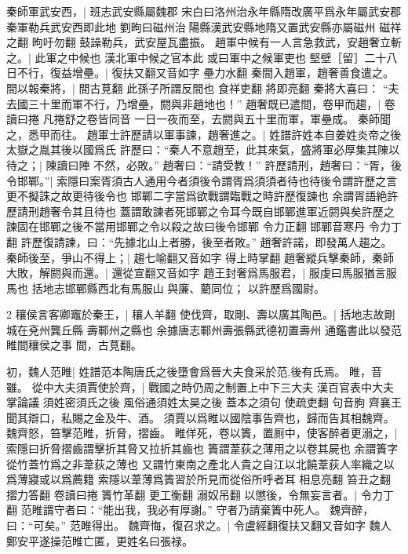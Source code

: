 秦師軍武安{\kern 2pt}西，|{
	班志武安縣屬魏郡
	宋白曰洛州治永年縣隋改廣平爲永年屬武安郡
	秦軍勒兵武安西即此地
	劉昫曰磁州治陽縣漢武安縣地隋又置武安縣亦屬磁州
	磁祥之翻
	昫吁勿翻
	}
鼓譟勒兵，武安屋瓦盡振。
趙軍中候有一人言急救武，安趙奢立斬之。|{
	此軍之中候也
	漢北軍中候之官本此
	或曰軍中之候軍吏也
	}
堅壁［留］二十八日不行，復益增壘。|{
	復扶又翻又音如字
	壘力水翻}
秦間入趙軍，趙奢善食遣之。
間以報秦將，|{
	間古莧翻
	此孫子所謂反間也
	食祥吏翻
	將即亮翻
	}
秦將大喜曰：
“夫去國三十里而軍不行，乃增壘，閼與非趙地也！”
趙奢既已遣間，卷甲而趨，|{
	卷讀曰捲
	凡捲舒之卷皆同音
	}
一日一夜而至，去閼與五十里而軍，軍壘成。
秦師聞之，悉甲而往。
趙軍士許歷請以軍事諫，趙奢進之。|{
	姓譜許姓本自姜姓炎帝之後太嶽之胤其後以國爲氏}
許歷曰：“秦人不意趙至，此其來氣，盛將軍必厚集其陳以待之；|{
	陳讀曰陣}
不然，必敗。”
趙奢曰：“請受教！”
許歷請刑，趙奢曰：“胥，後令邯鄲。”|{
	索隱曰案胥須古人通用今者須後令謂胥爲須須者待也待後令謂許歷之言更不擬誅之故更待後令也
	邯鄲二字當爲欲戰謂臨戰之時許歷復諫也
	余謂胥語絶許歷請刑趙奢令其且待也
	蓋謂敢諫者死邯鄲之令耳今既自邯鄲進軍近閼與矣許歷之諫固在邯鄲之後不當用邯鄲之令以殺之故曰後令邯鄲
	令力正翻
	邯鄲音寒丹
	令力丁翻
	}
許歷復請諫，曰：“先據北山上者勝，後至者敗。”
趙奢許諾，即發萬人趨之。
秦師後至，爭山不得上；|{
	趨七喻翻又音如字
	得上時掌翻
	}
趙奢縱兵擊秦師，秦師大敗，解閼與而還。|{
	還從宣翻又音如字}
趙王封奢爲馬服君，|{
	服虔曰馬服猶言服馬也
	括地志邯鄲縣西北有馬服山}
與廉、藺同位；
以許歷爲國尉。


2 穰侯言客卿竈於秦王，|{
	穰人羊翻}
使伐齊，取剛、壽以廣其陶邑。|{
	括地志故剛城在兗州龔丘縣
	壽鄆州之縣也
	余據唐志鄆州壽張縣武德初置壽州
	通鑑書此以發范睢間穰侯之事
	間，古莧翻。}

初，魏人范睢|{
	姓譜范本陶唐氏之後墮會爲晉大夫食采於范,後有氏焉。
	睢，音雖。}
從中大夫須賈使於齊，|{
	戰國之時仍周之制置上中下三大夫
	漢百官表中大夫掌論議
	須姓密須氏之後
	風俗通須姓太昊之後
	蓋本之須句
	使疏吏翻
	句音朐
	}
齊襄王聞其辯口，私賜之金及牛、酒。
須賈以爲睢以國陰事告齊也，歸而告其相魏齊。
魏齊怒，笞擊范睢，折脅，摺齒。
睢佯死，卷以簀，置厠中，使客醉者更溺之，|{
	索隱曰折脅摺齒謂擊折其脅又拉折其齒也
	簀謂葦荻之薄用之以卷其屍也
	余謂簀字從竹蓋竹爲之非葦荻之薄也
	又謂竹東南之產北人貴之自江以北饒葦荻人率織之以爲薄寢或以爲薦籍
	索隱以葦薄爲簀習於所見而從俗所呼者耳
	相息亮翻
	笞丑之翻
	摺力答翻
	卷讀曰捲
	簀竹革翻
	更工衡翻
	溺奴吊翻
	}
以懲後，令無妄言者。|{
	令力丁翻
	}
范睢謂守者曰：“能出我，我必有厚謝。”
守者乃請棄簀中死人。
魏齊醉，曰：“可矣。”
范睢得出。
魏齊悔，復召求之。|{
	令盧經翻復扶又翻又音如字
	}
魏人鄭安平遂操范睢亡匿，更姓名曰張禄。

